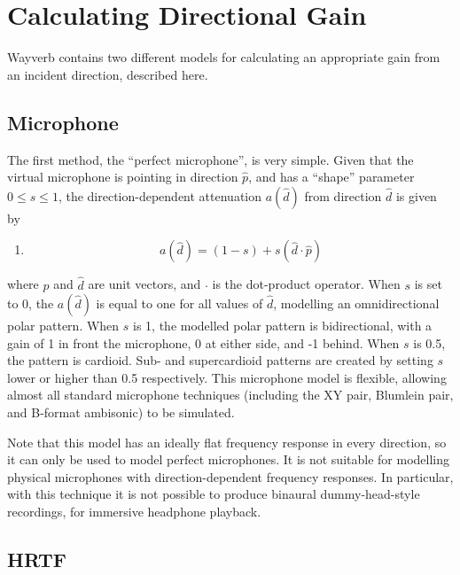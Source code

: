 \documentclass[]{scrreprt}
\providecommand{\tightlist}{%
  \setlength{\itemsep}{0pt}\setlength{\parskip}{0pt}}
\begin{document}
\hypertarget{calculating-directional-gain}{\section{Calculating
Directional Gain}\label{calculating-directional-gain}}

Wayverb contains two different models for calculating an appropriate
gain from an incident direction, described here.

\subsection{Microphone}\label{microphone}

The first method, the ``perfect microphone'', is very simple. Given that
the virtual microphone is pointing in direction \(\hat{p}\), and has a
``shape'' parameter \(0 \leq s \leq 1\), the direction-dependent
attenuation \(a(\hat{d})\) from direction \(\hat{d}\) is given by

\begin{enumerate}
\def\labelenumi{(\arabic{enumi})}
\setcounter{enumi}{32}
\tightlist
\item
  \[a(\hat{d}) = (1 - s) + s(\hat{d} \cdot \hat{p})\]
\end{enumerate}

where \(\hat{p}\) and \(\hat{d}\) are unit vectors, and \(\cdot\) is the
dot-product operator. When \(s\) is set to 0, the \(a(\hat{d})\) is
equal to one for all values of \(\hat{d}\), modelling an omnidirectional
polar pattern. When \(s\) is 1, the modelled polar pattern is
bidirectional, with a gain of 1 in front the microphone, 0 at either
side, and -1 behind. When \(s\) is 0.5, the pattern is cardioid. Sub-
and supercardioid patterns are created by setting \(s\) lower or higher
than 0.5 respectively. This microphone model is flexible, allowing
almost all standard microphone techniques (including the XY pair,
Blumlein pair, and B-format ambisonic) to be simulated.

Note that this model has an ideally flat frequency response in every
direction, so it can only be used to model perfect microphones. It is
not suitable for modelling physical microphones with direction-dependent
frequency responses. In particular, with this technique it is not
possible to produce binaural dummy-head-style recordings, for immersive
headphone playback.

\subsection{HRTF}\label{hrtf}
\end{document}

